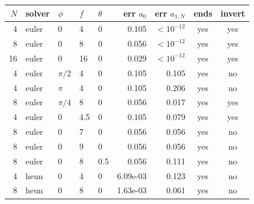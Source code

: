 \begin{tabular}{rllllrrcc}
\toprule
$N$ & solver & $\phi$ & $f$ & $\theta$ & err $a_0$ & err $a_{1,N}$ & ends & invert \\
\midrule
4 & euler & 0 & 4 & 0 & 0.105 & $<10^{-12}$ & yes & yes \\
8 & euler & 0 & 8 & 0 & 0.056 & $<10^{-12}$ & yes & yes \\
16 & euler & 0 & 16 & 0 & 0.029 & $<10^{-12}$ & yes & yes \\
4 & euler & $\pi/2$ & 4 & 0 & 0.105 & 0.105 & yes & no \\
4 & euler & $\pi$ & 4 & 0 & 0.105 & 0.206 & yes & no \\
8 & euler & $\pi/4$ & 8 & 0 & 0.056 & 0.017 & yes & yes \\
4 & euler & 0 & 4.5 & 0 & 0.105 & 0.079 & yes & yes \\
8 & euler & 0 & 7 & 0 & 0.056 & 0.056 & yes & no \\
8 & euler & 0 & 9 & 0 & 0.056 & 0.056 & yes & no \\
8 & euler & 0 & 8 & 0.5 & 0.056 & 0.111 & yes & no \\
4 & heun & 0 & 4 & 0 & 6.09e-03 & 0.123 & yes & no \\
8 & heun & 0 & 8 & 0 & 1.63e-03 & 0.061 & yes & no \\
\bottomrule
\end{tabular}
